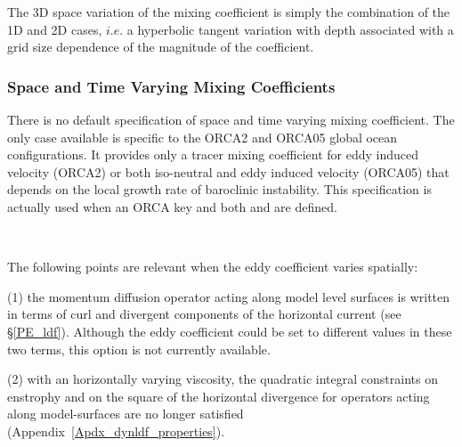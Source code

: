The 3D space variation of the mixing coefficient is simply the combination of the 
1D and 2D cases, $i.e.$ a hyperbolic tangent variation with depth associated with 
a grid size dependence of the magnitude of the coefficient. 

\subsubsection{Space and Time Varying Mixing Coefficients}

There is no default specification of space and time varying mixing coefficient. 
The only case available is specific to the ORCA2 and ORCA05 global ocean 
configurations. It provides only a tracer 
mixing coefficient for eddy induced velocity (ORCA2) or both iso-neutral and 
eddy induced velocity (ORCA05) that depends on the local growth rate of 
baroclinic instability. This specification is actually used when an ORCA key 
and both  and  are defined.

$\ $\newline    %

The following points are relevant when the eddy coefficient varies spatially:

(1) the momentum diffusion operator acting along model level surfaces is 
written in terms of curl and divergent components of the horizontal current 
(see \S\ref{PE_ldf}). Although the eddy coefficient could be set to different values 
in these two terms, this option is not currently available. 

(2) with an horizontally varying viscosity, the quadratic integral constraints 
on enstrophy and on the square of the horizontal divergence for operators 
acting along model-surfaces are no longer satisfied 
(Appendix~\ref{Apdx_dynldf_properties}).

